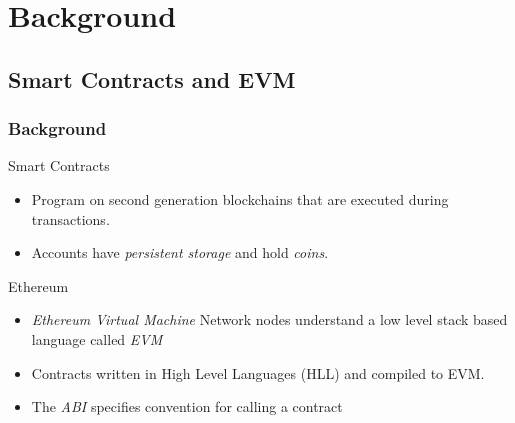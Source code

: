 \documentclass{beamer}
\begin{document}
\section{Background}
\subsection{Smart Contracts and EVM}
\begin{frame}
  \frametitle{Background}
  \begin{block}{Smart Contracts}
    \begin{itemize}
      \item Program on second generation blockchains that are executed
        during transactions.
      \item Accounts have \textit{persistent storage} and hold \textit{coins}.
    \end{itemize}
  \end{block}
  \pause
  \begin{block}{Ethereum}
    \begin{itemize}
      \item \textit{Ethereum Virtual Machine} Network nodes
        understand a low level stack based language called \textit{EVM}
      \item Contracts written in High Level Languages (HLL) and compiled to EVM.
      \item The \textit{ABI} specifies convention for calling a contract
    \end{itemize}
  \end{block}
\end{frame}
\end{document}
